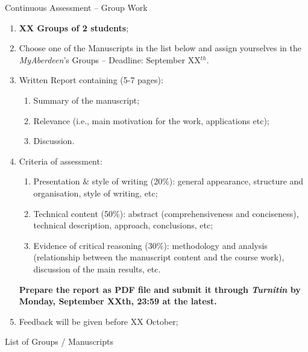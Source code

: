 \documentclass[12pts,a4paper]{report}%
\begin{document}
\begin{center}
{\Large Continuous Assessment -- Group Work}
\end{center}

\begin{enumerate}
%
\item {\bf XX Groups of 2 students};
%
\item Choose one of the Manuscripts in the list below and assign yourselves in the {\it MyAberdeen}'s Groups -- Deadline: September XX$^{th}$.
%
\item Written Report containing (5-7 pages):
  \begin{enumerate}
   \item Summary of the manuscript;
   \item Relevance (i.e., main motivation for the work, applications etc);
   \item Discussion.
  \end{enumerate}
%
\item Criteria of assessment:
  \begin{enumerate}
    \item Presentation $\&$ style of writing (20$\%$): general appearance, structure and organisation, style of writing, etc;
    \item Technical content (50$\%$): abstract (comprehensiveness and conciseness), technical description, approach, conclusions, etc;
    \item Evidence of critical reasoning (30$\%$): methodology and analysis (relationship between the manuscript content and the course work), discussion of the main results, etc.
  \end{enumerate}
  {\bf Prepare the report as PDF file and submit it through {\it Turnitin} by Monday, September XXth, 23:59 at the latest.}
 \item Feedback will be given before XX October;
\end{enumerate}
%


\clearpage

\begin{center}
{\Large List of Groups / Manuscripts}
\end{center}
\end{document}
